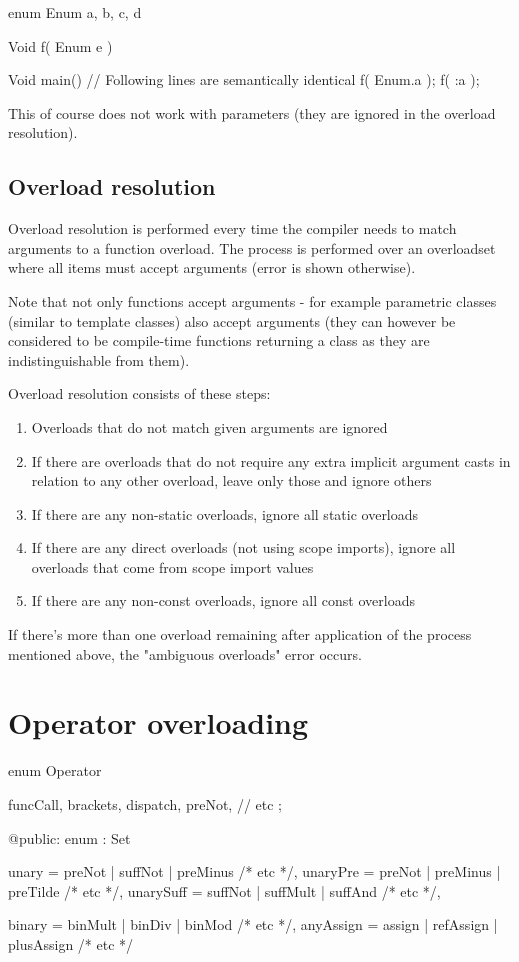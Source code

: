 \begin{code}
	enum Enum {
		a, b, c, d
	}
	
	Void f( Enum e ) {}
	
	Void main() {
		// Following lines are semantically identical
		f( Enum.a );
		f( :a );	
	}
\end{code}

This of course does not work with  parameters (they are ignored in the overload resolution).

\subsection{Overload resolution}
Overload resolution is performed every time the compiler needs to match arguments to a function overload. The process is performed over an overloadset where all items must accept arguments (error is shown otherwise).

Note that not only functions accept arguments - for example parametric classes (similar to template classes) also accept arguments (they can however be considered to be compile-time functions returning a class as they are indistinguishable from them).

Overload resolution consists of these steps:
\begin{enumerate}
	\item Overloads that do not match given arguments are ignored
	\item If there are overloads that do not require any extra implicit argument casts in relation to any other overload, leave only those and ignore others
	\item If there are any non-static overloads, ignore all static overloads
	\item If there are any direct overloads (not using scope imports), ignore all overloads that come from scope import values
	\item If there are any non-const overloads, ignore all const overloads
\end{enumerate}

If there's more than one overload remaining after application of the process mentioned above, the "ambiguous overloads" error occurs.

\section{Operator overloading}

\begin{code}
enum Operator {
	funcCall,
	brackets,
	dispatch,
	preNot,
	// etc
	;
	
@public:
	enum : Set {
		unary = preNot | suffNot | preMinus /* etc */,
		unaryPre = preNot | preMinus | preTilde /* etc */,
		unarySuff = suffNot | suffMult | suffAnd /* etc */,
		
		binary = binMult | binDiv | binMod /* etc */,
		anyAssign = assign | refAssign | plusAssign /* etc */
	}	
}
\end{code}

